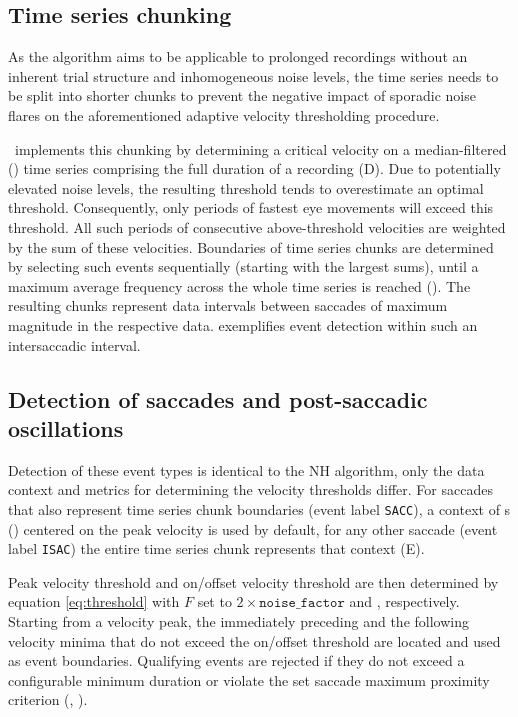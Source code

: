 \subsection*{Time series chunking}

As the algorithm aims to be applicable to prolonged recordings without an
inherent trial structure and inhomogeneous noise levels, the time series needs
to be split into shorter chunks to prevent the negative impact of sporadic
noise flares on the aforementioned adaptive velocity thresholding procedure.

\remodnav\ implements this chunking by determining a critical velocity on a
median-filtered () time series comprising the
full duration of a recording (D). Due to potentially elevated noise
levels, the resulting threshold tends to overestimate an optimal threshold.
Consequently, only periods of fastest eye movements will exceed this threshold.
All such periods of consecutive above-threshold velocities are weighted by the
sum of these velocities. Boundaries of time series chunks are determined by
selecting such events sequentially (starting with the largest sums), until a
maximum average frequency across the whole time series is reached
(). The resulting chunks represent data
intervals between saccades of maximum magnitude in the respective data.
 exemplifies event detection within such an intersaccadic interval.

\subsection*{Detection of saccades and post-saccadic oscillations}

Detection of these event types is identical to the NH algorithm, only the data
context and metrics for determining the velocity thresholds differ.  For
saccades that also represent time series chunk boundaries (event label
\texttt{SACC}), a context of \unit[1]{s}
() centered on the peak velocity is
used by default, for any other saccade (event label \texttt{ISAC}) the entire
time series chunk represents that context (E).

Peak velocity threshold and on/offset velocity threshold are then determined by
equation \ref{eq:threshold} with $F$ set to $2\times\mathtt{noise\_factor}$ and
, respectively. Starting from a velocity peak, the
immediately preceding and the following velocity minima that do not exceed the
on/offset threshold are located and used as event boundaries. Qualifying events
are rejected if they do not exceed a configurable minimum duration or violate
the set saccade maximum proximity criterion (,
).

